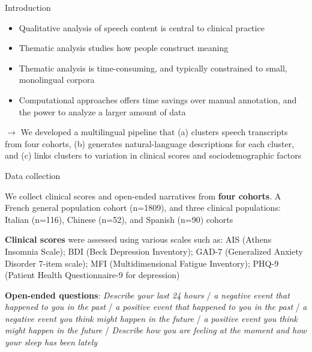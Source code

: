 \documentclass[handout,10pt]{beamer}
\begin{document}
\begin{frame}{Introduction}

  \begin{itemize}[<+->]
    \item Qualitative analysis of speech content is central to clinical practice
    \item Thematic analysis studies how people construct meaning%
    \item Thematic analysis is time-consuming, and typically constrained to small, monolingual corpora
    \item Computational approaches offers time savings over manual annotation, and the power to analyze a larger amount of data
  \end{itemize}

  \pause
  \vspace{0.5cm}

  $\rightarrow$ We developed a multilingual pipeline that (a) clusters speech transcripts from four cohorts, (b) generates natural-language descriptions for each cluster, and (c) links clusters to variation in clinical scores and sociodemographic factors %

\end{frame}

\begin{frame}{Data collection}

We collect clinical scores and open-ended narratives from \textbf{four cohorts}. A French general population cohort (n=1809), and three clinical populations: Italian (n=116), Chinese (n=52), and Spanish (n=90) cohorts%

\vspace{0.5cm}
\pause

\textbf{Clinical scores} were assessed using various scales such as: AIS (Athens Insomnia Scale); BDI (Beck Depression Inventory); GAD-7 (Generalized Anxiety Disorder 7-item scale); MFI (Multidimensional Fatigue Inventory); PHQ-9 (Patient Health Questionnaire-9 for depression)

\vspace{0.5cm}
\pause

\textbf{Open-ended questions}: \textit{Describe your last 24 hours} / \textit{a negative event that happened to you in the past} / \textit{a positive event that happened to you in the past} / \textit{a negative event you think might happen in the future} / \textit{a positive event you think might happen in the future} / \textit{Describe how you are feeling at the moment and how your sleep has been lately}

\end{frame}
\end{document}
